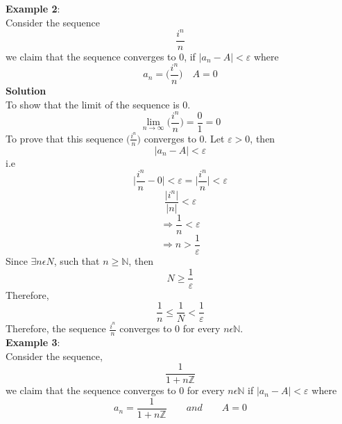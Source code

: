 \documentclass[a4paper, 12pt]{report}
\begin{document}
{\textbf{Example 2}:\\
Consider the sequence 
\begin{equation*}
\frac{i^n}{n}
\end{equation*}
we claim that the sequence converges to 0, if $|a_n - A| < \varepsilon$ where 
\begin{equation*}
a_n = \bigg(\frac{i^n}{n}\bigg) \quad A = 0
\end{equation*}
\textbf{Solution}\\
To show that the limit of the sequence is 0.
\begin{equation*}
\lim_{n\rightarrow\infty}\bigg(\frac{i^n}{n}\bigg) = \frac{0}{1} = 0
\end{equation*}
To prove that this sequence $\bigg(\frac{i^n}{n}\bigg)$ converges to 0. Let $\varepsilon > 0$, then
\begin{equation*}
|a_n - A| < \varepsilon 
\end{equation*}
i.e
\begin{equation*}
\bigg|\frac{i^n}{n} - 0\bigg| < \varepsilon = \bigg|\frac{i^n}{n}\bigg| < \varepsilon
\end{equation*}
\begin{equation*}
\frac{|i^n|}{|n|} < \varepsilon
\end{equation*}
\begin{equation*}
\Rightarrow \frac{1}{n} < \varepsilon
\end{equation*}
\begin{equation*}
\Rightarrow n > \frac{1}{\varepsilon}
\end{equation*}
Since $\exists n \epsilon N$, such that $n \geq \mathbb{N}$, then
\begin{equation*}
N \geq \frac{1}{\varepsilon}
\end{equation*}
Therefore,
\begin{equation*}
\frac{1}{n} \leq \frac{1}{N} < \frac{1}{\varepsilon}
\end{equation*}
Therefore, the sequence $\frac{i^n}{n}$ converges to 0 for every $n \epsilon \mathbb{N}$.\\
\textbf{Example 3}:\\
Consider the sequence,
\begin{equation*}
\frac{1}{1 + n\mathbb{Z}}
\end{equation*}
we claim that the sequence converges to 0 for every $n \epsilon \mathbb{N}$ if $|a_n - A| < \varepsilon$ where
\begin{equation*}
a_n = \frac{1}{1 + n\mathbb{Z}} \qquad and \qquad A = 0

\end{equation*}}
\end{document}
